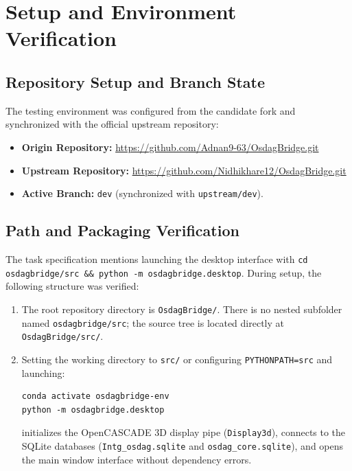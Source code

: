 \documentclass[11pt,a4paper]{article}
\begin{document}
\section{Setup and Environment Verification}

\subsection{Repository Setup and Branch State}
The testing environment was configured from the candidate fork and synchronized with the official upstream repository:
\begin{itemize}
    \item \textbf{Origin Repository:} \url{https://github.com/Adnan9-63/OsdagBridge.git}
    \item \textbf{Upstream Repository:} \url{https://github.com/Nidhikhare12/OsdagBridge.git}
    \item \textbf{Active Branch:} \texttt{dev} (synchronized with \texttt{upstream/dev}).
\end{itemize}

\subsection{Path and Packaging Verification}
The task specification mentions launching the desktop interface with \texttt{cd osdagbridge/src \&\& python -m osdagbridge.desktop}. During setup, the following structure was verified:
\begin{enumerate}
    \item The root repository directory is \texttt{OsdagBridge/}. There is no nested subfolder named \texttt{osdagbridge/src}; the source tree is located directly at \texttt{OsdagBridge/src/}.
    \item Setting the working directory to \texttt{src/} or configuring \texttt{PYTHONPATH=src} and launching:
\begin{lstlisting}[basicstyle=\ttfamily\scriptsize]
conda activate osdagbridge-env
python -m osdagbridge.desktop
\end{lstlisting}
    initializes the OpenCASCADE 3D display pipe (\texttt{Display3d}), connects to the SQLite databases (\texttt{Intg\_osdag.sqlite} and \texttt{osdag\_core.sqlite}), and opens the main window interface without dependency errors.
\end{enumerate}
\end{document}

